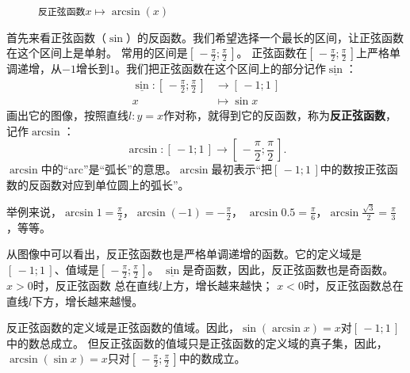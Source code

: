 \documentclass[12pt,UTF8]{ctexbook}
\begin{document}
\begin{figure}[h]
    \caption*{\texttt{反正弦函数}$x\mapsto \arcsin(x)$}
\end{figure}

首先来看正弦函数（$\sin$）的反函数。我们希望选择一个最长的区间，让正弦函数在这个区间上是单射。
常用的区间是$[\,-\frac{\pi}{2}; \frac{\pi}{2}\,]$。
正弦函数在$[\,-\frac{\pi}{2}; \frac{\pi}{2}\,]$上严格单调递增，从$-1$增长到$1$。我们把正弦函数在这个区间上的部分记作$\underline{\sin}$：
\begin{align*}
     \underline{\sin} : [\,-\frac{\pi}{2}; \frac{\pi}{2}\,] &\rightarrow [\,-1; 1\,] \\
                                                           x &\mapsto \sin{x} 
\end{align*}
画出它的图像，按照直线$l: y = x$作对称，就得到它的反函数，称为\textbf{反正弦函数}，记作$\arcsin$：
$$ \arcsin : [\,-1; 1\,] \rightarrow [\,-\frac{\pi}{2}; \frac{\pi}{2}\,] . $$
$\arcsin$中的“arc”是“弧长”的意思。$\arcsin$最初表示“把$[\,-1; 1\,]$中的数按正弦函数的反函数对应到单位圆上的弧长”。

举例来说，$\arcsin{1} = \frac{\pi}{2}$，$\arcsin{(-1)} = -\frac{\pi}{2}$，
$\arcsin{0.5} = \frac{\pi}{6}$，$\arcsin{\frac{\sqrt{3}}{2}} = \frac{\pi}{3}$，等等。

从图像中可以看出，反正弦函数也是严格单调递增的函数。它的定义域是$[\,-1; 1\,]$、值域是$\left[\,-\frac{\pi}{2}; \frac{\pi}{2}\,\right]$。
$\underline{\sin}$是奇函数，因此，反正弦函数也是奇函数。$x > 0$时，反正弦函数
总在直线$l$上方，增长越来越快；
$x < 0$时，反正弦函数总在直线$l$下方，增长越来越慢。

反正弦函数的定义域是正弦函数的值域。因此，$\sin{(\arcsin{x})} = x$对$[\,-1; 1\,]$中的数总成立。
但反正弦函数的值域只是正弦函数的定义域的真子集，因此，$\arcsin{(\sin{x})} = x$只对$\left[\,-\frac{\pi}{2}; \frac{\pi}{2}\,\right]$中的数成立。
\end{document}
